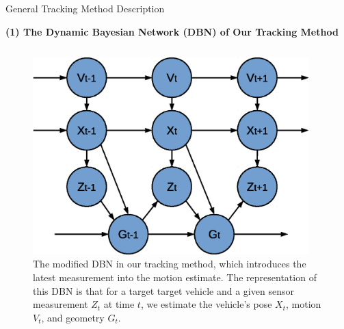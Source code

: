 \documentclass[final,hyperref={pdfpagelabels=false}]{beamer}
\begin{document}
\begin{frame}[t]
\begin{columns}[t]
\begin{column}{0.47\textwidth}
\begin{block}{General Tracking Method Description}
\begin{center}
\textbf{(1) The Dynamic Bayesian Network (DBN) of Our Tracking Method}
\end{center}
\begin{columns}[t]
	\begin{column}{0.48\textwidth}
		\begin{figure}
			\centering
			\includegraphics[width=0.95\textwidth]{./img/DBN}
			\caption{The modified DBN in our tracking method, which introduces the latest measurement into the motion estimate. The representation of this DBN is that for a target target vehicle and a given sensor measurement $Z_t$ at time $t$, we estimate the vehicle's pose $X_t$, motion $V_t$, and geometry $G_t$.}
			\label{fig:DBN}
		\end{figure}
	\end{column}
	

\end{columns}
\end{block}
\end{column}
\end{columns}
\end{frame}
\end{document}
